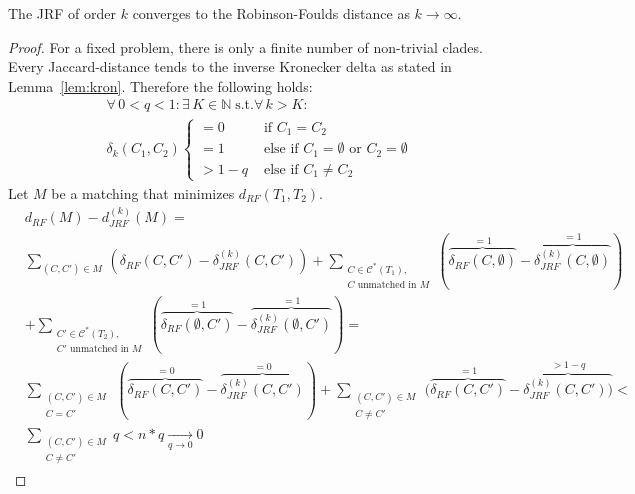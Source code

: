 \begin{thm}
The JRF of order $k$ converges to the Robinson-Foulds distance as $k \to \infty$.
\end{thm}
\begin{proof}
For a fixed problem, there is only a finite number of non-trivial clades. Every Jaccard-distance tends to the inverse Kronecker delta as stated in Lemma~\ref{lem:kron}. Therefore the following holds:
\begin{align*}
\forall \, 0 < q < 1: \exists \, K \in \mathbb{N} \; \text{s.t.} \forall \, k > K:\\
 \delta_k(C_1,C_2) 
 \begin{cases} 
 = 0 &\text{ if }C_1 = C_2 \\
 = 1 &\text{ else if } C_1 = \emptyset \text{ or } C_2 = \emptyset\\
 > 1-q &\text{ else if } C_1 \neq C_2
 \end{cases}
\end{align*}
Let $M$ be a matching that minimizes $d_{RF}(T_1,T_2)$. 
\begin{align*}
&d_{RF}(M) - d_{JRF}^{(k)}(M) =\\
&\sum_{(C, C') \in M} \, (\delta_{RF}(C,C') - \delta_{JRF}^{(k)}(C,C')) + \sum_{\substack{C \in \mathcal{C}^*(T_1),\\ C\text{ unmatched in }M}} (\overbrace{\delta_{RF}(C, \emptyset)}^{=1} - \overbrace{\delta_{JRF}^{(k)}(C, \emptyset)}^{=1}) \\
&+ \sum_{\substack{C' \in \mathcal{C}^*(T_2),\\C'\text{ unmatched in }M}} (\overbrace{\delta_{RF}(\emptyset, C')}^{=1} - \overbrace{\delta_{JRF}^{(k)}(\emptyset, C')}^{=1}) = \\
&\sum_{\substack{(C, C') \in M \\ C = C'}} \, (\overbrace{\delta_{RF}(C,C')}^{=0} - \overbrace{\delta_{JRF}^{(k)}(C,C')}^{=0}) + \sum_{\substack{(C, C') \in M \\ C \neq C'}} \, (\overbrace{\delta_{RF}(C,C')}^{=1} - \overbrace{\delta_{JRF}^{(k)}(C,C'))}^{> 1-q} < \\
& \sum_{\substack{(C, C') \in M \\ C \neq C'}} q < n*q \underset{q \rightarrow 0}{\rightarrow} 0 
\end{align*}
\end{proof}

